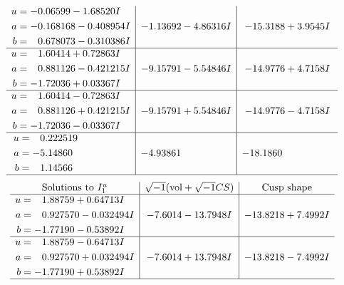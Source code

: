\documentclass[1p]{elsarticle_modified}
\theoremstyle{definition}
\newcommand{\I}{\sqrt{-1}}
\begin{document}
$$\begin{array}{c|c|c}
\begin{aligned}
u &= -0.06599 - 1.68520 I \\
a &= -0.168168 - 0.408954 I \\
b &= \phantom{-}0.678073 - 0.310386 I\end{aligned}
 & -1.13692 - 4.86316 I & -15.3188 + 3.9545 I \\ \hline\begin{aligned}
u &= \phantom{-}1.60414 + 0.72863 I \\
a &= \phantom{-}0.881126 - 0.421215 I \\
b &= -1.72036 + 0.03367 I\end{aligned}
 & -9.15791 - 5.54846 I & -14.9776 + 4.7158 I \\ \hline\begin{aligned}
u &= \phantom{-}1.60414 - 0.72863 I \\
a &= \phantom{-}0.881126 + 0.421215 I \\
b &= -1.72036 - 0.03367 I\end{aligned}
 & -9.15791 + 5.54846 I & -14.9776 - 4.7158 I \\ \hline\begin{aligned}
u &= \phantom{-}0.222519\phantom{ +0.000000I} \\
a &= -5.14860\phantom{ +0.000000I} \\
b &= \phantom{-}1.14566\phantom{ +0.000000I}\end{aligned}
 & -4.93861\phantom{ +0.000000I} & -18.1860\phantom{ +0.000000I}\\
 \hline 
 \end{array}$$\newpage$$\begin{array}{c|c|c}  
\text{Solutions to }I^u_{1}& \I (\text{vol} + \sqrt{-1}CS) & \text{Cusp shape}\\
 \hline 
\begin{aligned}
u &= \phantom{-}1.88759 + 0.64713 I \\
a &= \phantom{-}0.927570 - 0.032494 I \\
b &= -1.77190 - 0.53892 I\end{aligned}
 & -7.6014 - 13.7948 I & -13.8218 + 7.4992 I \\ \hline\begin{aligned}
u &= \phantom{-}1.88759 - 0.64713 I \\
a &= \phantom{-}0.927570 + 0.032494 I \\
b &= -1.77190 + 0.53892 I\end{aligned}
 & -7.6014 + 13.7948 I & -13.8218 - 7.4992 I\\
 \hline 
 \end{array}$$\newpage\newpage\renewcommand{\arraystretch}{1}
\end{document}
